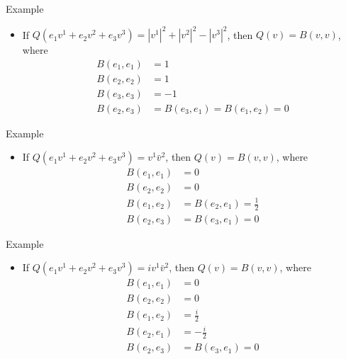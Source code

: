 \documentclass[usenames,dvipsnames,10pt]{beamer}
\begin{document}
\begin{frame}
  {Example}
  
  \begin{itemize}
  \item If $Q(e_1v^1+e_2v^2+e_3v^3) = |v^1|^2 + |v^2|^2 - |v^3|^2$, then $Q(v) = B(v,v)$, where
    \begin{align*}
      B(e_1,e_1) &= 1\\
      B(e_2,e_2) &= 1\\
      B(e_3,e_3) &= -1\\
      B(e_2,e_3) &= B(e_3,e_1) = B(e_1,e_2) = 0
    \end{align*}
  \end{itemize}
\end{frame}

\begin{frame}
  {Example}
  
  \begin{itemize}
  \item If $Q(e_1v^1+e_2v^2+e_3v^3) = v^1\bar{v}^2$, then $Q(v) = B(v,v)$, where
    \begin{align*}
      B(e_1,e_1) &= 0\\
      B(e_2,e_2) &= 0\\
      B(e_1,e_2) &= B(e_2,e_1) = \frac{1}{2}\\
      B(e_2,e_3) &= B(e_3,e_1) = 0
    \end{align*}
  \end{itemize}
\end{frame}

\begin{frame}
  {Example}
  
  \begin{itemize}
  \item If $Q(e_1v^1+e_2v^2+e_3v^3) = iv^1\bar{v}^2$, then $Q(v) = B(v,v)$, where
    \begin{align*}
      B(e_1,e_1) &= 0\\
      B(e_2,e_2) &= 0\\
      B(e_1,e_2) &= \frac{i}{2}\\
      B(e_2,e_1) &= -\frac{i}{2}\\
      B(e_2,e_3) &= B(e_3,e_1) = 0
    \end{align*}
  \end{itemize}
\end{frame}
\end{document}
